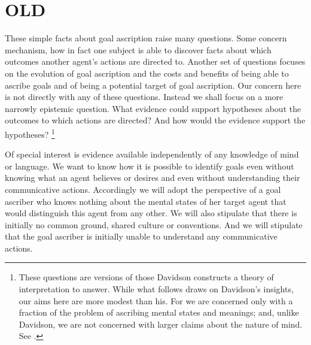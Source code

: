 \documentclass[14pt,a4paper]{extarticle}
\begin{document}
\section{OLD}

These simple facts about goal ascription raise many questions.
Some concern mechanism, how in fact one subject is able to discover facts about which outcomes another agent's actions are directed to.
Another set of questions focuses on the evolution of goal ascription and the costs and benefits of being able to ascribe goals and of being a potential target of goal ascription.
Our concern here is not directly with any of these questions.
Instead we shall focus on a more narrowly epistemic question.
What evidence could support hypotheses about the outcomes to which actions are directed?
And how would the evidence support the hypotheses?%
\footnote{
These questions are versions of those Davidson constructs a theory of interpretation to answer.
While what follows draws  on Davidson's insights,
our aims here are more modest than his.
For we are concerned only with a  fraction of the problem of ascribing mental states and meanings;
and, unlike Davidson, we are not concerned with larger claims about the nature of mind.
See
\citet{Davidson:1973jx,Davidson:1990du,lepore_donald_2005}.
}

Of special interest is evidence available independently of any knowledge of mind or language.
We want to know how it is possible to identify goals even without knowing what an agent believes or desires and even without understanding their communicative actions.
Accordingly we will adopt the perspective of a goal ascriber who knows nothing about the mental states of her target agent that would distinguish this agent from any other.
We will also stipulate that there is initially no common ground, shared culture or conventions.
And we will stipulate that the goal ascriber is initially unable to understand any communicative actions.
\end{document}

